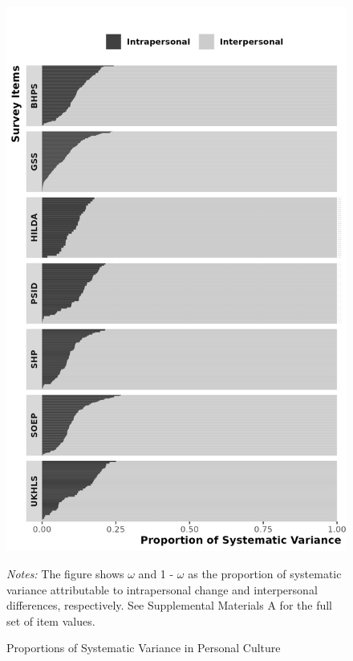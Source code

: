 \documentclass[
  12pt,
]{article}
\begin{document}
\begin{figure}[ht]
\caption{Proportions of Systematic Variance in Personal Culture}

\begin{center}\includegraphics[width=20.83in]{../figures/figure_1_bw} \end{center}

\textit{Notes:} The figure shows $\omega$ and 1 - $\omega$ as the proportion of systematic variance attributable to intrapersonal change and interpersonal differences, respectively. See Supplemental Materials A for the full set of item values. 
\end{figure}
\end{document}
